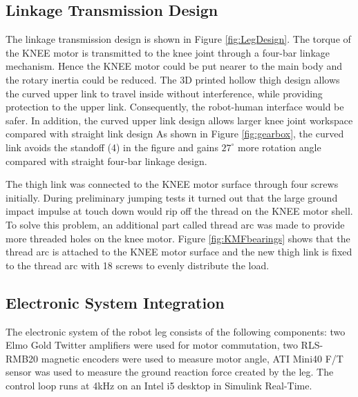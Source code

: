 \subsection{\textbf{Linkage Transmission Design}}
\label{sec:legDesign}

The linkage transmission design is shown in Figure \ref{fig:LegDesign}. The torque of the KNEE motor is transmitted to the knee joint through a four-bar linkage mechanism. Hence the KNEE motor could be put nearer to the main body and the rotary inertia could be reduced. The 3D printed hollow thigh design allows the curved upper link to travel inside without interference, while providing protection to the upper link. Consequently, the robot-human interface would be safer. In addition, the curved upper link design allows larger knee joint workspace compared with straight link design As shown in Figure \ref{fig:gearbox}, the curved link avoids the standoff (4) in the figure and gains $27^{\circ}$ more rotation angle compared with straight four-bar linkage design.

The thigh link was connected to the KNEE motor surface through four screws initially. During preliminary jumping tests it turned out that the large ground impact impulse at touch down would rip off the thread on the KNEE motor shell. To solve this problem, an additional part called thread arc was made to provide more threaded holes on the knee motor. Figure \ref{fig:KMFbearings} shows that the thread arc is attached to the KNEE motor surface and the new thigh link is fixed to the thread arc with 18 screws to evenly distribute the load.

\subsection{\textbf{Electronic System Integration}}
\label{sec:Electronics}

The electronic system of the robot leg consists of the following components: two Elmo Gold Twitter amplifiers were used for motor commutation, two RLS-RMB20 magnetic encoders were used to measure motor angle, ATI Mini40 F/T sensor was used to measure the ground reaction force created by the leg. The control loop runs at 4kHz on an Intel i5 desktop in Simulink Real-Time. 



